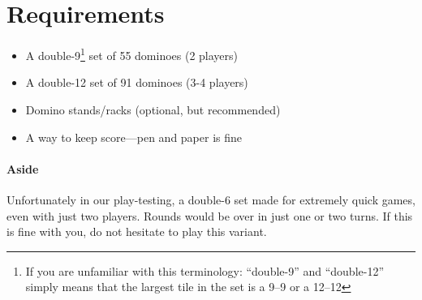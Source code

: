 \section{Requirements}
\begin{itemize}
    \item A double-9\footnote{If you are unfamiliar with this terminology: ``double-9'' and ``double-12'' simply means that the largest tile in the set is a 9--9 or a 12--12} set of 55 dominoes (2 players)
    \item A double-12 set of 91 dominoes (3-4 players)
    \item Domino stands/racks (optional, but recommended)
    \item A way to keep score---pen and paper is fine
\end{itemize}

\paragraph{Aside} Unfortunately in our play-testing, a double-6 set made for extremely quick games, even with just two players. Rounds would be over in just one or two turns. If this is fine with you, do not hesitate to play this variant.
